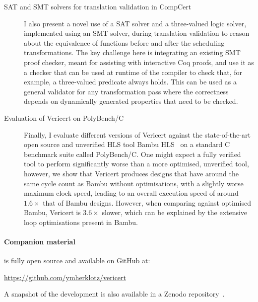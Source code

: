 \begin{description}
\item[SAT and SMT solvers for translation validation in CompCert] I also present
  a novel use of a \gls{SAT} solver and a three-valued logic solver, implemented
  using an \gls{SMT} solver, during translation validation to reason about the
  equivalence of functions before and after the scheduling transformations.  The
  key challenge here is integrating an existing \gls{SMT} proof checker, meant
  for assisting with interactive Coq proofs, and use it as a checker that can be
  used at runtime of the compiler to check that, for example, a three-valued
  predicate always holds.  This can be used as a general validator for any
  transformation pass where the correctness depends on dynamically generated
  properties that need to be checked.


\item[Evaluation of Vericert on PolyBench/C] Finally, I evaluate different
  versions of Vericert against the state-of-the-art open source and unverified
  \gls{HLS} tool Bambu HLS~\cite{pilato13_bambu} on a standard C benchmark suite
  called PolyBench/C.  One might expect a fully verified tool to perform
  significantly worse than a more optimised, unverified tool, however, we show
  that Vericert produces designs that have around the same cycle count as Bambu
  without optimisations, with a slightly worse maximum clock speed, leading to
  an overall execution speed of around $1.6\times$ that of Bambu designs.
  However, when comparing against optimised Bambu, Vericert is $3.6\times$
  slower, which can be explained by the extensive loop optimisations present in
  Bambu.
\end{description}

\paragraph{Companion material}
\vericert{} is fully open source and available on GitHub at:

\begin{center}
  \url{https://github.com/ymherklotz/vericert}
\end{center}

A snapshot of the \vericert{} development is also available in a Zenodo
repository~\cite{herklotz24_v}.


